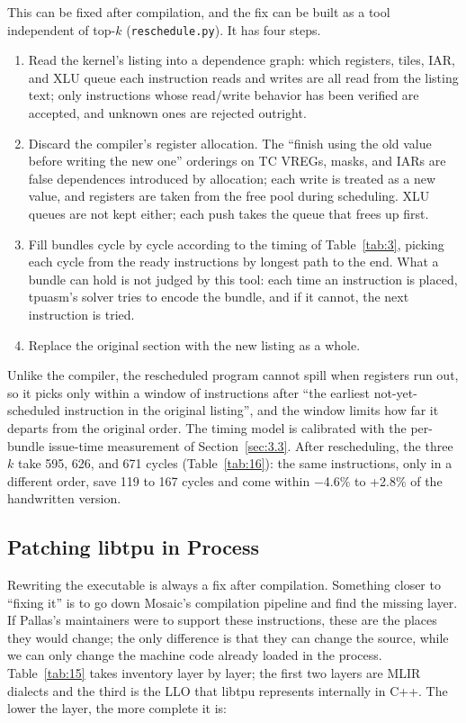 \documentclass[sigconf,nonacm,balance=false]{acmart}
\newcommand{\code}[1]{\texttt{#1}}
\begin{document}
This can be fixed after compilation, and the fix can be built as a tool independent of top-$k$ (\code{reschedule.\allowbreak{}py}). It has four steps.

\begin{enumerate}
\item Read the kernel's listing into a dependence graph: which registers, tiles, IAR, and XLU queue each instruction reads and writes are all read from the listing text; only instructions whose read/write behavior has been verified are accepted, and unknown ones are rejected outright.
\item Discard the compiler's register allocation. The ``finish using the old value before writing the new one'' orderings on TC VREGs, masks, and IARs are false dependences introduced by allocation; each write is treated as a new value, and registers are taken from the free pool during scheduling. XLU queues are not kept either; each push takes the queue that frees up first.
\item Fill bundles cycle by cycle according to the timing of Table~\ref{tab:3}, picking each cycle from the ready instructions by longest path to the end. What a bundle can hold is not judged by this tool: each time an instruction is placed, tpuasm's solver tries to encode the bundle, and if it cannot, the next instruction is tried.
\item Replace the original section with the new listing as a whole.
\end{enumerate}

Unlike the compiler, the rescheduled program cannot spill when registers run out, so it picks only within a window of instructions after ``the earliest not-yet-scheduled instruction in the original listing'', and the window limits how far it departs from the original order. The timing model is calibrated with the per-bundle issue-time measurement of Section~\ref{sec:3.3}. After rescheduling, the three $k$ take 595, 626, and 671 cycles (Table~\ref{tab:16}): the same instructions, only in a different order, save 119 to 167 cycles and come within $-$4.6\% to +2.8\% of the handwritten version.

\subsection{Patching libtpu in Process}
\label{sec:7.3}

Rewriting the executable is always a fix after compilation. Something closer to ``fixing it'' is to go down Mosaic's compilation pipeline and find the missing layer. If Pallas's maintainers were to support these instructions, these are the places they would change; the only difference is that they can change the source, while we can only change the machine code already loaded in the process. Table~\ref{tab:15} takes inventory layer by layer; the first two layers are MLIR dialects and the third is the LLO that libtpu represents internally in C++. The lower the layer, the more complete it is:
\end{document}
